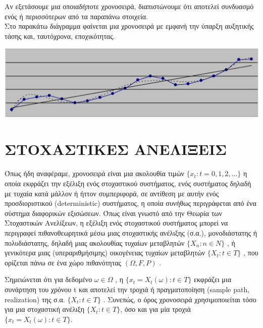 Αν εξετάσουμε μια οποιαδήποτε χρονοσειρά, διαπιστώνουμε ότι αποτελεί συνδυασμό
ενός ή περισσότερων από τα παραπάνω στοιχεία.\\
Στο παρακάτω διάγραμμα φαίνεται μια χρονοσειρά με εμφανή την ύπαρξη αυξητικής
τάσης και, ταυτόχρονα, εποχικότητας.\\
\begin{center}
\includegraphics[scale=0.3]{graf4.png}
\end{center}



\section{ΣΤΟΧΑΣΤΙΚΕΣ ΑΝΕΛΙΞΕΙΣ}
Όπως ήδη αναφέραμε, χρονοσειρά είναι μια ακολουθία τιμών
$\{ x_t : t = 0,1,2,\ldots\}$ η οποία εκφράζει την εξέλιξη ενός στοχαστικού συστήματος, ενός
συστήματος δηλαδή με τυχαία κατά μάλλον ή ήττον συμπεριφορά, σε αντίθεση με
αυτήν ενός προσδιοριστικού (deterministic) συστήματος, η οποία συνήθως
περιγράφεται από ένα σύστημα διαφορικών εξισώσεων. Όπως είναι γνωστό από την
Θεωρία των Στοχαστικών Ανελίξεων, η εξέλιξη ενός στοχαστικού συστήματος
μπορεί να περιγραφεί πιθανοθεωρητικά μέσω μιας στοχαστικής ανέλιξης (σ.α.),
μονοδιάστατης ή πολυδιάστατης, δηλαδή μιας ακολουθίας τυχαίων μεταβλητών
$\{X_n : n \in N \}$ , ή γενικότερα μιας (υπεραριθμήσιμης) οικογένειας τυχαίων
μεταβλητών $\{X_t : t \in T \}$ , που ορίζεται πάνω σε ένα χώρο πιθανότητας $\left(\Omega , F , P \right)$ .

Σημειώνεται ότι για δεδομένο $\omega \in \Omega$ , η $ \{x_t=X_t\left(\omega\right):t \in T\}$ εκφράζει μια
συνάρτηση του χρόνου t και αποτελεί την τροχιά ή πραγματοποίηση (sample path,
realization) της σ.α. $\{ X_t : t \in T \}$ . Συνεπώς, ο όρος χρονοσειρά
χρησιμοποιείται τόσο για μια στοχαστική ανέλιξη $\{ X_t : t \in T \}$, όσο και για μία
τροχιά $ \{x_t=X_t\left(\omega\right):t \in T\}$.

